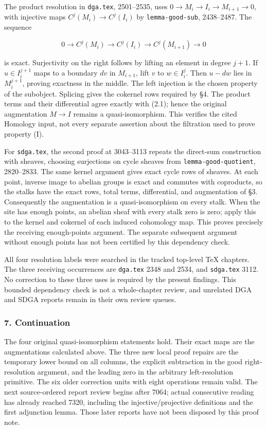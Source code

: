 The product resolution in \texttt{dga.tex}, 2501--2535, uses \(0\to M_i\to I_i\to M_{i+1}\to0\), with injective maps \(C^j(M_i)\to C^j(I_i)\) by \texttt{lemma-good-sub}, 2438--2487. The sequence

\[
0\to C^j(M_i)\to C^j(I_i)\to C^j(M_{i+1})\to0
\]

is exact. Surjectivity on the right follows by lifting an element in degree \(j+1\). If \(u\in I_i^{j+1}\) maps to a boundary \(dv\) in \(M_{i+1}\), lift \(v\) to \(w\in I_i^j\). Then \(u-dw\) lies in \(M_i^{j+1}\), proving exactness in the middle. The left injection is the chosen property of the subobject. Splicing gives the cokernel rows required by §4. The product terms and their differential agree exactly with (2.1); hence the original augmentation \(M\to I\) remains a quasi-isomorphism. This verifies the cited Homology input, not every separate assertion about the filtration used to prove property (I).

For \texttt{sdga.tex}, the second proof at 3043--3113 repeats the direct-sum construction with sheaves, choosing surjections on cycle sheaves from \texttt{lemma-good-quotient}, 2820--2833. The same kernel argument gives exact cycle rows of sheaves. At each point, inverse image to abelian groups is exact and commutes with coproducts, so the stalks have the exact rows, total terms, differential, and augmentation of §3. Consequently the augmentation is a quasi-isomorphism on every stalk. When the site has enough points, an abelian sheaf with every stalk zero is zero; apply this to the kernel and cokernel of each induced cohomology map. This proves precisely the receiving enough-points argument. The separate subsequent argument without enough points has not been certified by this dependency check.

All four resolution labels were searched in the tracked top-level TeX chapters. The three receiving occurrences are \texttt{dga.tex} 2348 and 2534, and \texttt{sdga.tex} 3112. No correction to these three uses is required by the present findings. This bounded dependency check is not a whole-chapter review, and unrelated DGA and SDGA reports remain in their own review queues.

\subsubsection{7. Continuation}\label{continuation}

The four original quasi-isomorphism statements hold. Their exact maps are the augmentations calculated above. The three new local proof repairs are the temporary lower bound on all columns, the explicit subtraction in the good right-resolution argument, and the leading zero in the arbitrary left-resolution primitive. The six older correction units with eight operations remain valid. The next source-ordered report review begins after 7064; actual consecutive reading has already reached 7320, including the injective/projective definitions and the first adjunction lemma. Those later reports have not been disposed by this proof note.
